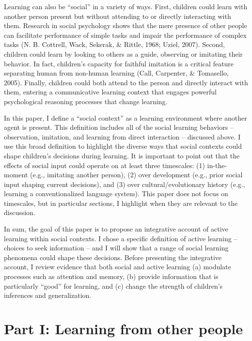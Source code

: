 \documentclass[english,floatsintext,man]{apa6}
\theoremstyle{definition}
\theoremstyle{definition}
\theoremstyle{definition}
\theoremstyle{remark}
\begin{document}
Learning can also be \enquote{social} in a variety of ways. First,
children could learn with another person present but without attending
to or directly interacting with them. Research in social psychology
shows that the mere presence of other people can facilitate performance
of simple tasks and impair the performance of complex tasks (N. B.
Cottrell, Wack, Sekerak, \& Rittle, 1968; Uziel, 2007). Second, children
could learn by looking to others as a guide, observing or imitating
their behavior. In fact, children's capacity for faithful imitation is a
critical feature separating human from non-human learning (Call,
Carpenter, \& Tomasello, 2005). Finally, children could both attend to
the person and directly interact with them, entering a communicative
learning context that engages powerful psychological reasoning processes
that change learning.

In this paper, I define a \enquote{social context} as a learning
environment where another agent is present. This definition includes all
of the social learning behaviors -- observation, imitation, and learning
from direct interaction -- discussed above. I use this broad definition
to highlight the diverse ways that social contexts could shape
children's decisions during learning. It is important to point out that
the effects of social input could operate on at least three timescales:
(1) in-the-moment (e.g., imitating another person), (2) over development
(e.g., prior social input shaping current decisions), and (3) over
cultural/evolutionary history (e.g., learning a conventionalized
language system). This paper does not focus on timescales, but in
particular sections, I highlight when they are relevant to the
discussion.

In sum, the goal of this paper is to propose an integrative account of
active learning within social contexts. I chose a specific definition of
active learning -- choices to seek information -- and I will show that a
range of social learning phenomena could shape these decisions. Before
presenting the integrative account, I review evidence that both social
and active learning (a) modulate processes such as attention and memory,
(b) provide information that is particularly \enquote{good} for
learning, and (c) change the strength of children's inferences and
generalization.

\hypertarget{p1}{\section{Part I: Learning from other people}\label{p1}}
\end{document}
